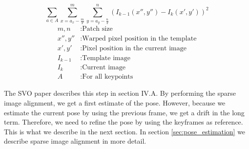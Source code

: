 \documentclass[11pt,a4paper,titlepage,oneside]{report}
\begin{document}
\begin{equation}\label{eq:intensity}
  \sum_{a \in A}\sum_{x=a_x-\frac{m}{2}}^m\sum_{y=a_y-\frac{n}{2}}^n(I_{k-1}(x'',y'')-I_{k}(x',y'))^2
\end{equation}
\begin{align*}
  m,n         &: \text{Patch size}\\
  x'',y''    &: \text{Warped pixel position in the template}\\
  x',y'      &: \text{Pixel position in the current image}\\
  I_{k-1}    &: \text{Template image}\\
  I_{k}      &: \text{Current image}\\
  A          &: \text{For all keypoints}
\end{align*}

The SVO paper \cite{svo} describes this step in section IV.A. By performing the sparse image alignment, we get a first estimate of the pose. However, because we estimate the current pose by using the previous frame, we get a drift in the long term. Therefore, we need to refine the pose by using the keyframes as reference. This is what we describe in the next section. In section \ref{sec:pose_estimation} we describe sparse image alignment in more detail.
\end{document}
